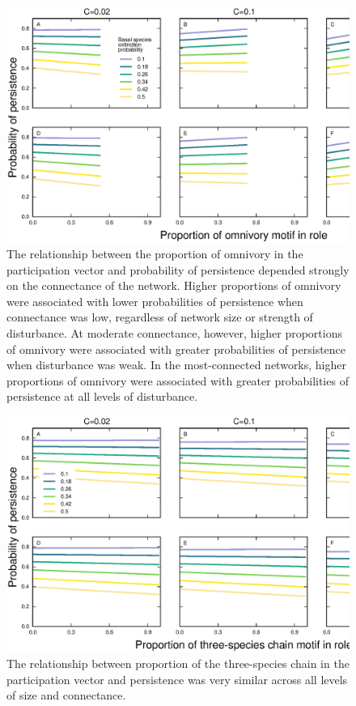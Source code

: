 \documentclass[12pt]{article}
\begin{document}
\begin{spacing}{2.0}
    \begin{figure}[ht!]
        \centering
        \includegraphics[width=\textwidth]{figures/persistence_omnivory_detailpers.eps}
        \caption{The relationship between the proportion of omnivory in the participation vector and probability of persistence depended strongly on the connectance of the network.
        Higher proportions of omnivory were associated with lower probabilities of persistence when connectance was low, regardless of network size or strength of disturbance.
        At moderate connectance, however, higher proportions of omnivory were associated with greater probabilities of persistence when disturbance was weak.
        In the most-connected networks, higher proportions of omnivory were associated with greater probabilities of persistence at all levels of disturbance.}
        \label{omnivory_plus_SC}
        \end{figure}

    \begin{figure}[hb!]
        \centering
        \includegraphics[width=\textwidth]{figures/persistence_chain_detailpers.eps}
        \caption{The relationship between proportion of the three-species chain in the participation vector and persistence was very similar across all levels of size and connectance.}
        \label{chain_plus_SC}
        \end{figure}


\end{spacing}
\end{document}
